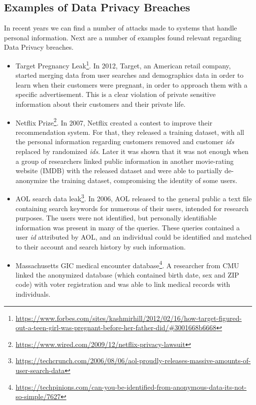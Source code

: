 \subsection{Examples of Data Privacy Breaches}
\label{ssec:ExamplesDataPrivacyBreaches}


In recent years we can find a number of attacks made to systems that handle personal information. Next are a number of examples found relevant regarding Data Privacy breaches.

\begin{itemize}
    \setlength\itemsep{1em}

    \item Target Pregnancy Leak\footnote{\url{https://www.forbes.com/sites/kashmirhill/2012/02/16/how-target-figured-out-a-teen-girl-was-pregnant-before-her-father-did/\#3001668b6668}}. In 2012, Target, an American retail company, started merging data from user searches and demographics data in order to learn when their customers were pregnant, in order to approach them with a specific advertisement. This is a clear violation of private sensitive information about their customers and their private life.


    \item Netflix Prize\footnote{\url{https://www.wired.com/2009/12/netflix-privacy-lawsuit}}. In 2007, Netflix created a contest to improve their recommendation system. For that, they released a training dataset, with all the personal information regarding customers removed and customer \textit{ids} replaced by randomized \textit{ids}. Later it was shown that it was not enough when a group of researchers linked public information in another movie-rating website (IMDB) with the released dataset and were able to partially de-anonymize the training dataset, compromising the identity of some users.

    \item AOL search data leak\footnote{\url{https://techcrunch.com/2006/08/06/aol-proudly-releases-massive-amounts-of-user-search-data}}. In 2006, AOL released to the general public a text file containing search keywords for numerous of their users, intended for research purposes. The users were not identified, but personally identifiable information was present in many of the queries. These queries contained a user \textit{id} attributed by AOL, and an individual could be identified and matched to their account and search history by such information.



   \item Massachusetts GIC medical encounter database\footnote{\url{https://techpinions.com/can-you-be-identified-from-anonymous-data-its-not-so-simple/7627}}. A researcher from \ac{CMU} linked the anonymized database (which contained birth date, sex and ZIP code) with voter registration and was able to link medical records with individuals.


\end{itemize}